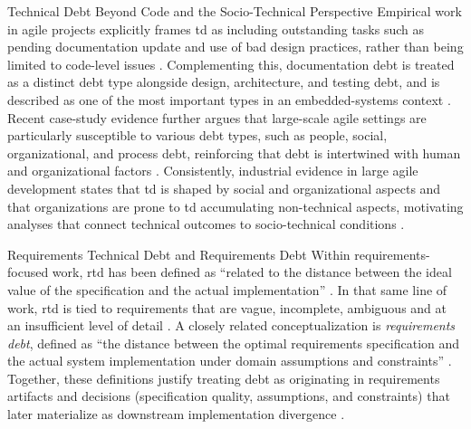 \documentclass[12pt,reqno, twoside]{amsbook}
\makeatletter
\def\section{\@startsection{section}{1}%
      \z@{.5\linespacing\@plus.7\linespacing}{.25\linespacing}%
      {\normalfont\bfseries\flushleft}}
\theoremstyle{plain}
\numberwithin{equation}{chapter}
\numberwithin{section}{chapter}
\makeatother
\begin{document}
\section{Technical Debt Beyond Code and the Socio-Technical Perspective}
\noindent Empirical work in agile projects explicitly frames \gls{td} as including outstanding tasks such as pending documentation update and use of bad design practices, rather than being limited to code-level issues \parencite{Rios2019}. Complementing this, documentation debt is treated as a distinct debt type alongside design, architecture, and testing debt, and is described as one of the most important types in an embedded-systems context \parencite{Rios2020}. Recent case-study evidence further argues that large-scale agile settings are particularly susceptible to various debt types, such as people, social, organizational, and process debt, reinforcing that debt is intertwined with human and organizational factors \parencite{Herath2025b}. Consistently, industrial evidence in large agile development states that \gls{td} is shaped by social and organizational aspects and that organizations are prone to \gls{td} accumulating non-technical aspects, motivating analyses that connect technical outcomes to socio-technical conditions \parencite{Ahmad2026}.

\section{Requirements Technical Debt and Requirements Debt}
\noindent Within requirements-focused work, \gls{rtd} has been defined as ``related to the distance between the ideal value of the specification and the actual implementation'' \parencite{Melo2022}. In that same line of work, \gls{rtd} is tied to requirements that are vague, incomplete, ambiguous and at an insufficient level of detail \parencite{Melo2022}. A closely related conceptualization is \textit{requirements debt}, defined as ``the distance between the optimal requirements specification and the actual system implementation under domain assumptions and constraints'' \parencite{Lenarduzzi2019}. Together, these definitions justify treating debt as originating in requirements artifacts and decisions (specification quality, assumptions, and constraints) that later materialize as downstream implementation divergence \parencite{Melo2022,Lenarduzzi2019}.
\end{document}
